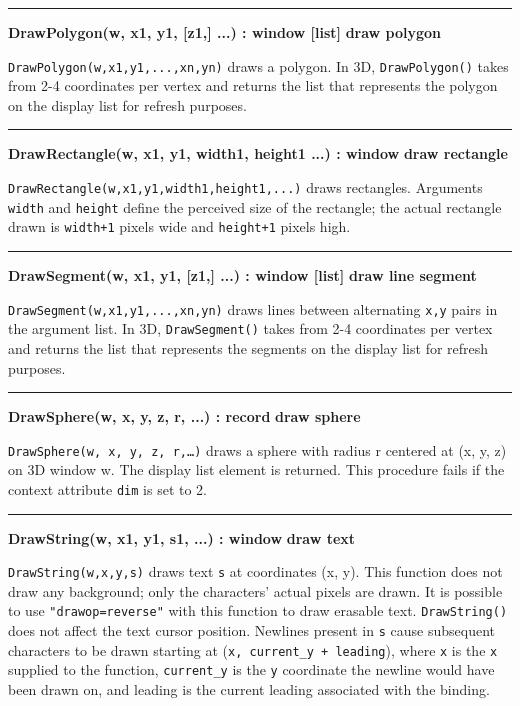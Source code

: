 \bigskip\hrule\vspace{0.1cm}
\noindent
{\bf DrawPolygon(w, x1, y1, [z1,] ...) : window [list] } \hfill {\bf draw polygon}

\noindent
\texttt{DrawPolygon(w,x1,y1,...,xn,yn)} draws a polygon. In 3D,
\texttt{DrawPolygon()} takes from 2-4 coordinates per vertex and returns the
list that represents the polygon on the display list for refresh
purposes.

\bigskip\hrule\vspace{0.1cm}
\noindent
{\bf DrawRectangle(w, x1, y1, width1, height1 ...) : window } \hfill {\bf draw rectangle}

\noindent
\texttt{DrawRectangle(w,x1,y1,width1,height1,...)} draws rectangles.
Arguments \texttt{width} and \texttt{height} define the perceived size
of the rectangle; the actual rectangle drawn is \texttt{width+1} pixels
wide and \texttt{height+1} pixels high.

\bigskip\hrule\vspace{0.1cm}
\noindent
{\bf DrawSegment(w, x1, y1, [z1,] ...) : window [list] } \hfill {\bf draw line segment}

\noindent
\texttt{DrawSegment(w,x1,y1,...,xn,yn)} draws lines between alternating
\texttt{x,y} pairs in the argument list. In 3D, \texttt{DrawSegment()}
takes from 2-4 coordinates per vertex and returns the list that
represents the segments on the display list for refresh purposes.

\bigskip\hrule\vspace{0.1cm}
\noindent
{\bf DrawSphere(w, x, y, z, r, ...) : record } \hfill {\bf draw sphere}

\noindent
\texttt{DrawSphere(w, x, y, z, r,{\dots})} draws a sphere with radius
r centered at (x, y, z) on 3D window w. The display list element is
returned. This procedure fails if the context attribute \texttt{dim} is
set to 2.

\bigskip\hrule\vspace{0.1cm}
\noindent
{\bf DrawString(w, x1, y1, s1, ...) : window } \hfill {\bf draw text}

\noindent
\texttt{DrawString(w,x,y,s)} draws text \texttt{s} at coordinates (x,
y). This function does not draw any background; only the
characters' actual pixels are drawn. It is possible to
use \texttt{"drawop=reverse"} with this
function to draw erasable text. \texttt{DrawString()} does not affect
the text cursor position. Newlines present in \texttt{s} cause
subsequent characters to be drawn starting at
(\texttt{x, current\_y + leading}), where \texttt{x} is the
\texttt{x} supplied to the function,
\texttt{current\_y} is the \texttt{y} coordinate the newline would have
been drawn on, and leading is the current leading associated with the
binding.

